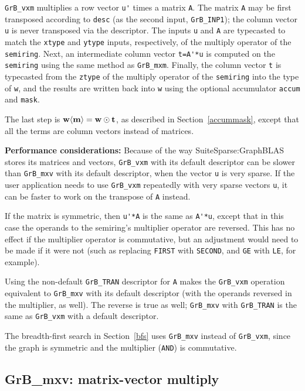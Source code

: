 \documentclass[12pt]{article}
\begin{document}
\verb'GrB_vxm' multiplies a row vector \verb"u'" times a matrix \verb'A'.  The
matrix \verb'A' may be first transposed according to \verb'desc' (as the second
input, \verb'GrB_INP1'); the column vector \verb'u' is never transposed via the
descriptor.  The inputs \verb'u' and \verb'A' are typecasted to match the
\verb'xtype' and \verb'ytype' inputs, respectively, of the multiply operator of
the \verb'semiring'.  Next, an intermediate column vector \verb"t=A'*u" is
computed on the \verb'semiring' using the same method as \verb'GrB_mxm'.
Finally, the column vector \verb't' is typecasted from the \verb'ztype' of the
multiply operator of the \verb'semiring' into the type of \verb'w', and the
results are written back into \verb'w' using the optional accumulator
\verb'accum' and \verb'mask'.

The last step is ${\bf w \langle m \rangle  = w \odot t}$, as described
in Section~\ref{accummask}, except that all the
terms are column vectors instead of matrices.

{\bf Performance considerations:}  Because of the way SuiteSparse:Graph\-BLAS
stores its matrices and vectors, \verb'GrB_vxm' with its default descriptor can
be slower than \verb'GrB_mxv' with its default descriptor, when the vector
\verb'u' is very sparse.  If the user application needs to use \verb'GrB_vxm'
repeatedly with very sparse vectors \verb'u', it can be faster to work on
the transpose of \verb'A' instead.

If the matrix is symmetric, then \verb"u'*A" is the same as \verb"A'*u", except
that in this case the operands to the semiring's multiplier operator are
reversed.  This has no effect if the multiplier operator is commutative, but an
adjustment would need to be made if it were not (such as replacing \verb'FIRST'
with \verb'SECOND', and \verb'GE' with \verb'LE', for example).

Using the non-default \verb'GrB_TRAN' descriptor for \verb'A' makes the
\verb'GrB_vxm' operation equivalent to \verb'GrB_mxv' with its default
descriptor (with the operands reversed in the multiplier, as well).  The
reverse is true as well; \verb'GrB_mxv' with \verb'GrB_TRAN' is the same as
\verb'GrB_vxm' with a default descriptor.

The breadth-first search in Section~\ref{bfs} uses \verb'GrB_mxv'
instead of \verb'GrB_vxm', since the graph is symmetric and the multiplier
(\verb'AND') is commutative.

\newpage
\subsection{{\sf GrB\_mxv:} matrix-vector multiply} %
\label{mxv}
\end{document}
